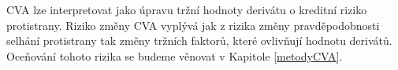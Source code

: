 \documentclass[a4paper,12pt]{report}
\theoremstyle{definition} \newtheorem{definice}[veta]{Definice}
\theoremstyle{remark}
\begin{document}
CVA lze interpretovat jako úpravu tržní hodnoty derivátu o kreditní riziko protistrany.
Riziko změny CVA vyplývá jak z rizika změny pravděpodobnosti selhání protistrany tak změny tržních faktorů, které ovlivňují hodnotu derivátů.
Oceňování tohoto rizika se budeme věnovat v Kapitole \ref{metodyCVA}.




\end{document}
